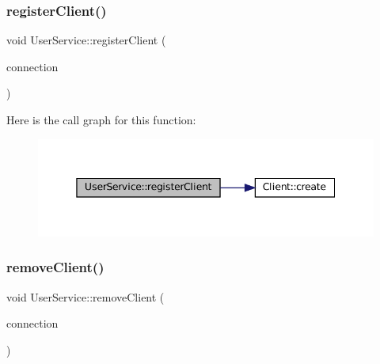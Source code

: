 \mbox{\label{classUserService_a7fde1ac30d6bc9e9177def82097cd73b}} 
\subsubsection{\texorpdfstring{register\+Client()}{registerClient()}}
{\footnotesize\ttfamily void User\+Service\+::register\+Client (\begin{DoxyParamCaption}\item[{boost\+::shared\+\_\+ptr$<$ \mbox{\hyperlink{classIConnection}{I\+Connection}} $>$ \&}]{connection }\end{DoxyParamCaption})\hspace{0.3cm}{\ttfamily [inline]}}

Here is the call graph for this function\+:
\nopagebreak
\begin{figure}[H]
\begin{center}
\leavevmode
\includegraphics[width=345pt]{classUserService_a7fde1ac30d6bc9e9177def82097cd73b_cgraph}
\end{center}
\end{figure}
\mbox{\label{classUserService_af919fd2cca398408c61081aaadb26e88}} 
\subsubsection{\texorpdfstring{remove\+Client()}{removeClient()}}
{\footnotesize\ttfamily void User\+Service\+::remove\+Client (\begin{DoxyParamCaption}\item[{boost\+::shared\+\_\+ptr$<$ \mbox{\hyperlink{classIConnection}{I\+Connection}} $>$ \&}]{connection }\end{DoxyParamCaption})\hspace{0.3cm}{\ttfamily [inline]}}

